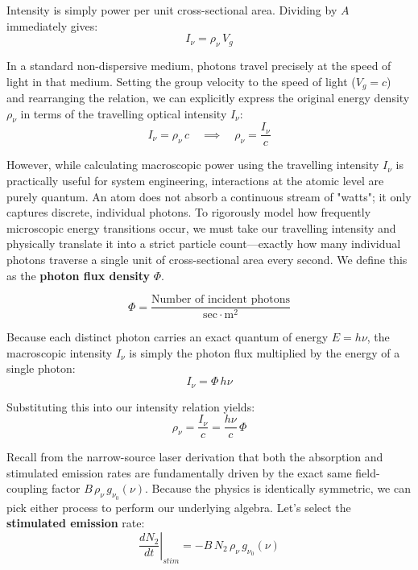 Intensity is simply power per unit cross-sectional area. Dividing by $A$ immediately gives:
\begin{equation*}
    I_\nu = \rho_\nu\,V_g
\end{equation*}

In a standard non-dispersive medium, photons travel precisely at the speed of light in that medium. Setting the group velocity to the speed of light ($V_g = c$) and rearranging the relation, we can explicitly express the original energy density $\rho_\nu$ in terms of the travelling optical intensity $I_\nu$:
\begin{equation*}
    I_\nu = \rho_\nu\,c \quad \implies \quad \rho_\nu = \frac{I_\nu}{c}
\end{equation*}

However, while calculating macroscopic power using the travelling intensity $I_\nu$ is practically useful for system engineering, interactions at the atomic level are purely quantum. An atom does not absorb a continuous stream of "watts"; it only captures discrete, individual photons. To rigorously model how frequently microscopic energy transitions occur, we must take our travelling intensity and physically translate it into a strict particle count—exactly how many individual photons traverse a single unit of cross-sectional area every second. We define this as the \textbf{photon flux density} $\Phi$.

\begin{equation*}
    \Phi = \frac{\text{Number of incident photons}}{\text{sec} \cdot \text{m}^2}
\end{equation*}

Because each distinct photon carries an exact quantum of energy $E = h\nu$, the macroscopic intensity $I_\nu$ is simply the photon flux multiplied by the energy of a single photon:
\begin{equation*}
    I_\nu = \Phi\,h\nu
\end{equation*}

Substituting this into our intensity relation yields:
\begin{equation*}
    \rho_\nu = \frac{I_\nu}{c} = \frac{h\nu}{c}\,\Phi
\end{equation*}

Recall from the narrow-source laser derivation that both the absorption and stimulated emission rates are fundamentally driven by the exact same field-coupling factor $B\,\rho_\nu\,g_{\nu_0}(\nu)$. Because the physics is identically symmetric, we can pick either process to perform our underlying algebra. Let's select the \textbf{stimulated emission} rate:
\begin{equation*}
    \left.\frac{dN_2}{dt}\right|_{stim} = -B\,N_2\,\rho_\nu\,g_{\nu_0}(\nu)
\end{equation*}

